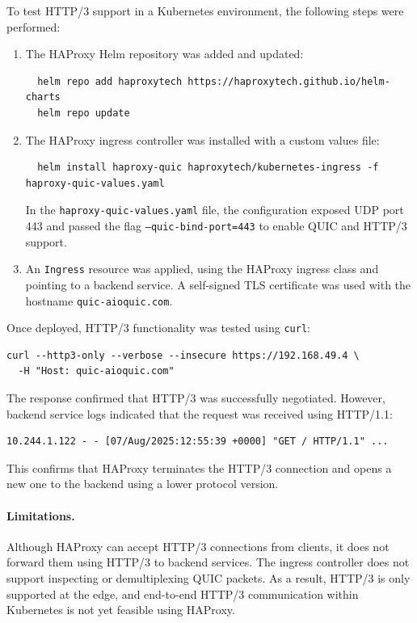 To test HTTP/3 support in a Kubernetes environment, the following steps were performed:

\begin{enumerate}
  \item The HAProxy Helm repository was added and updated:
  \begin{verbatim}
  helm repo add haproxytech https://haproxytech.github.io/helm-charts
  helm repo update
  \end{verbatim}

  \item The HAProxy ingress controller was installed with a custom values file:
  \begin{verbatim}
  helm install haproxy-quic haproxytech/kubernetes-ingress -f haproxy-quic-values.yaml
  \end{verbatim}

  In the \texttt{haproxy-quic-values.yaml} file, the configuration exposed UDP port 443 and passed the flag \texttt{--quic-bind-port=443} to enable QUIC and HTTP/3 support.

  \item An \texttt{Ingress} resource was applied, using the HAProxy ingress class and pointing to a backend service. A self-signed TLS certificate was used with the hostname \texttt{quic-aioquic.com}.
\end{enumerate}

Once deployed, HTTP/3 functionality was tested using \texttt{curl}:

\begin{verbatim}
curl --http3-only --verbose --insecure https://192.168.49.4 \
  -H "Host: quic-aioquic.com"
\end{verbatim}

The response confirmed that HTTP/3 was successfully negotiated. However, backend service logs indicated that the request was received using HTTP/1.1:

\begin{verbatim}
10.244.1.122 - - [07/Aug/2025:12:55:39 +0000] "GET / HTTP/1.1" ...
\end{verbatim}

This confirms that HAProxy terminates the HTTP/3 connection and opens a new one to the backend using a lower protocol version.

\paragraph{Limitations.}
Although HAProxy can accept HTTP/3 connections from clients, it does not forward them using HTTP/3 to backend services. The ingress controller does not support inspecting or demultiplexing QUIC packets. As a result, HTTP/3 is only supported at the edge, and end-to-end HTTP/3 communication within Kubernetes is not yet feasible using HAProxy.



